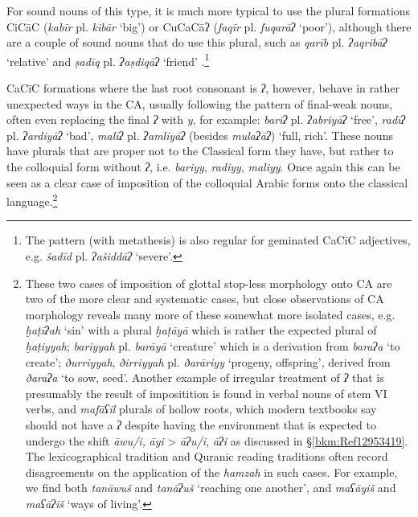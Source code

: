 \documentclass[output=paper]{langsci/langscibook}
\begin{document}
For sound nouns of this type, it is much more typical to use the plural formations CiCāC (\textit{kabīr} pl. \textit{kibār} ‘big’) or CuCaCāʔ (\textit{faqīr} pl. \textit{fuqarāʔ} ‘poor’), although there are a couple of sound nouns that do use this plural, such as \textit{qarīb} pl. \textit{ʔaqribāʔ} ‘relative’ and \textit{ṣadīq} pl. \textit{ʔaṣdiqāʔ} ‘friend’ \citep[106--107]{Ratcliffe1998}.\footnote{The pattern (with metathesis) is also regular for geminated CaCīC adjectives, e.g. \textit{šadīd}  pl. \textit{ʔašiddāʔ} ‘severe’.}

CaCīC formations where the last root consonant is \textit{ʔ}, however, behave in rather unexpected ways in the CA, usually following the pattern of final-weak nouns, often even replacing the final \textit{ʔ} with \textit{y}, for example: \textit{barīʔ} pl. \textit{ʔabriyāʔ} ‘free’, \textit{radīʔ} pl. \textit{ʔardiyāʔ} ‘bad’, \textit{malīʔ} pl. \textit{ʔamliyāʔ} (besides \textit{mulaʔāʔ}) ‘full, rich’. These nouns have plurals that are proper not to the Classical form they have, but rather to the colloquial form without \textit{ʔ}, i.e. \textit{bariyy}, \textit{radiyy}, \textit{maliyy}. Once again this can be seen as a clear case of imposition of the colloquial Arabic forms onto the classical language.\footnote{These two cases of imposition of glottal stop-less morphology onto CA are two of the more clear and systematic cases, but close observations of CA morphology reveals many more of these somewhat more isolated cases, e.g. \textit{ḫaṭīʔah} ‘sin’ with a plural \textit{ḫaṭāyā} which is rather the expected plural of \textit{ḫaṭiyyah}; \textit{bariyyah} pl. \textit{barāyā} ‘creature’ which is a derivation from \textit{baraʔa} ‘to create’; \textit{ðurriyyah}, \textit{ðirriyyah} pl. \textit{ðarāriyy} ‘progeny, offspring’, derived from \textit{ðaraʔa} ‘to sow, seed’. Another example of irregular treatment of \textit{ʔ} that is presumably the result of impositition is found in verbal nouns of stem VI verbs, and \textit{mafāʕil} plurals of hollow roots, which modern textbooks say should not have a \textit{ʔ} despite having the environment that is expected to undergo the shift \textit{āwu/i,} \textit{āyi} > \textit{āʔu/i,} \textit{āʔi} as discussed in §\ref{bkm:Ref12953419}. The lexicographical tradition and Quranic reading traditions often record disagreements on the application of the \textit{hamzah} in such cases. For example, we find both \textit{tanāwuš} and \textit{tanāʔuš} ‘reaching one another’, and \textit{maʕāyiš} and \textit{maʕāʔiš} ‘ways of living’.}
\end{document}
